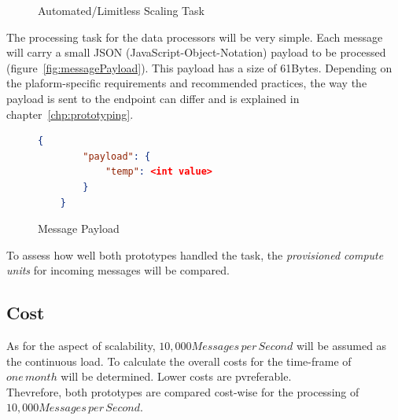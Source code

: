 \begin{figure}[ht]
    \centering
    \caption {Automated/Limitless Scaling Task}
    \label{graph:scalingTask}
\end{figure}

The processing task for the data processors will be very simple. Each message will carry a small JSON (JavaScript-Object-Notation) payload to be processed (figure~\vref{fig:messagePayload}). This payload has a size of 61Bytes. Depending on the plaform-specific requirements and recommended practices, the way the payload is sent to the endpoint can differ and is explained in chapter~\vref{chp:prototyping}. 

\begin{figure}
    \begin{lstlisting}[language=json,firstnumber=1]
    {
        "payload": {
            "temp": <int value>
        }
    }
    \end{lstlisting}\centering
    \caption{Message Payload}
    \label{fig:messagePayload}
\end{figure}

To assess how well both prototypes handled the task, the \textit{provisioned compute units} for incoming messages will be compared. 


\subsection{Cost}

As for the aspect of scalability, $10,000 Messages\,per\,Second$ will be assumed as the continuous load. To calculate the overall costs for the time-frame of $one\,month$ will be determined. Lower costs are pvreferable.\\
Thevrefore, both prototypes are compared cost-wise for the processing of $10,000 Messages\,per\,Second$.



